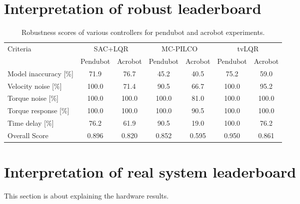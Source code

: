 \section{Interpretation of robust leaderboard}

\begin{table}[H]
  \centering
 \begin{tabular}{lcccccc}
 \hline
 Criteria & \multicolumn{2}{c}{SAC+LQR} & \multicolumn{2}{c}{MC-PILCO} & \multicolumn{2}{c}{tvLQR} \\
 & Pendubot & Acrobot & Pendubot & Acrobot & Pendubot & Acrobot \\
 \hline
 Model inaccuracy [\%] & 71.9 & 76.7 & 45.2 & 40.5 & 75.2 & 59.0 \\
 Velocity noise [\%] & 100.0 & 71.4 & 90.5 & 66.7 & 100.0 & 95.2 \\
 Torque noise [\%] & 100.0 & 100.0 & 100.0 & 81.0 & 100.0 & 100.0 \\
 Torque response [\%] & 100.0 & 100.0 & 100.0 & 90.5 & 100.0 & 100.0 \\
 Time delay [\%] & 76.2 & 61.9 & 90.5 & 19.0 & 100.0 & 76.2 \\
 Overall Score & 0.896 & 0.820 & 0.852 & 0.595 & 0.950 & 0.861 \\
 \hline
 \end{tabular}
 \caption{Robustness scores of various controllers for pendubot and acrobot experiments.}
 \label{tab:robustness}
\end{table}

\section{Interpretation of real system leaderboard}
This section is about explaining the hardware results.

